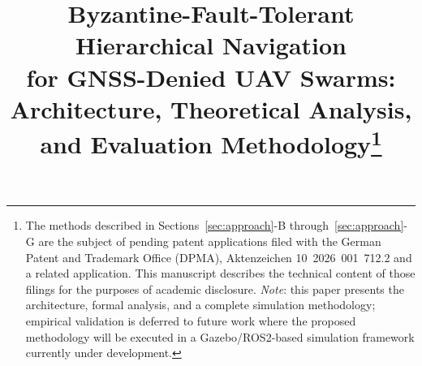 \documentclass[conference,10pt]{IEEEtran}
\begin{document}
\pagestyle{plain}

\title{Byzantine-Fault-Tolerant Hierarchical Navigation\\ for GNSS-Denied UAV Swarms:\\ Architecture, Theoretical Analysis, and Evaluation Methodology\thanks{The methods described in Sections~\ref{sec:approach}-B through~\ref{sec:approach}-G are the subject of pending patent applications filed with the German Patent and Trademark Office (DPMA), Aktenzeichen 10~2026~001~712.2 and a related application. This manuscript describes the technical content of those filings for the purposes of academic disclosure. \emph{Note}: this paper presents the architecture, formal analysis, and a complete simulation methodology; empirical validation is deferred to future work where the proposed methodology will be executed in a Gazebo/ROS2-based simulation framework currently under development.}}

\author{
}

\maketitle
\end{document}
